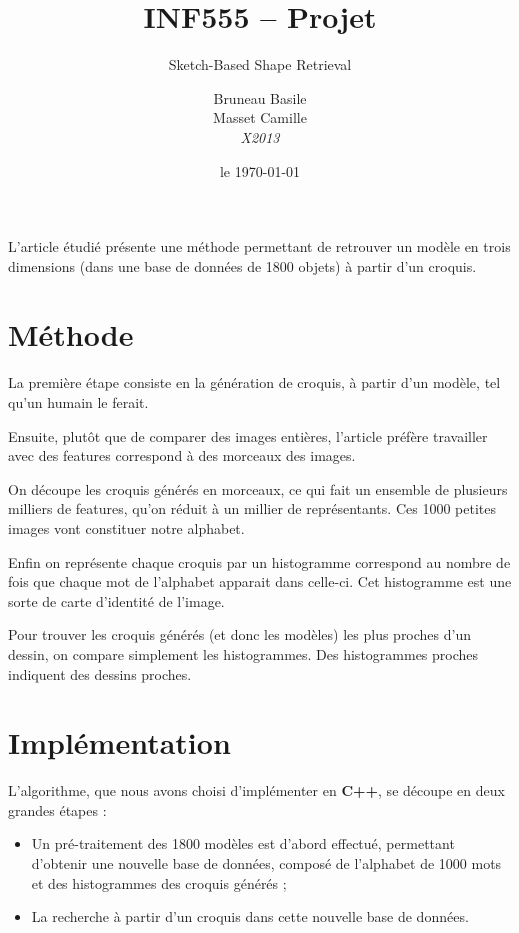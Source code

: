 \documentclass[12pt, a4paper, oneside]{article}
\title{INF555 -- Projet}
\subtitle{Sketch-Based Shape Retrieval}
\date{le \today}
\author{Bruneau Basile\\Masset Camille\\\emph{X2013}}
\begin{document}
\renewcommand{\labelitemi}{\starredbullet}

\maketitle


L'article étudié présente une méthode permettant de retrouver un modèle en trois dimensions (dans une base de données de \num{1800} objets) à partir d'un croquis.

\section{Méthode}
\label{sec:Méthode}

La première étape consiste en la génération de croquis, à partir d'un modèle, tel qu'un humain le ferait.

Ensuite, plutôt que de comparer des images entières, l'article préfère travailler avec des features correspond à des morceaux des images.

On découpe les croquis générés en morceaux, ce qui fait un ensemble de plusieurs milliers de features, qu'on réduit à un millier de représentants.
Ces \num{1000} petites images vont constituer notre alphabet.

Enfin on représente chaque croquis par un histogramme correspond au nombre de fois que chaque mot de l'alphabet apparait dans celle-ci.
Cet histogramme est une sorte de carte d'identité de l'image.

Pour trouver les croquis générés (et donc les modèles) les plus proches d'un dessin, on compare simplement les histogrammes.
Des histogrammes proches indiquent des dessins proches.



\section{Implémentation}
\label{sec:Implémentation}

L'algorithme, que nous avons choisi d'implémenter en \textbf{C++}, se découpe en deux grandes étapes :
\begin{itemize}
    \item Un pré-traitement des \num{1800} modèles est d'abord effectué, permettant d'obtenir une nouvelle base de données, composé de l'alphabet de \num{1000} mots et des histogrammes des croquis générés ;
    \item La recherche à partir d'un croquis dans cette nouvelle base de données.
\end{itemize}
\end{document}
